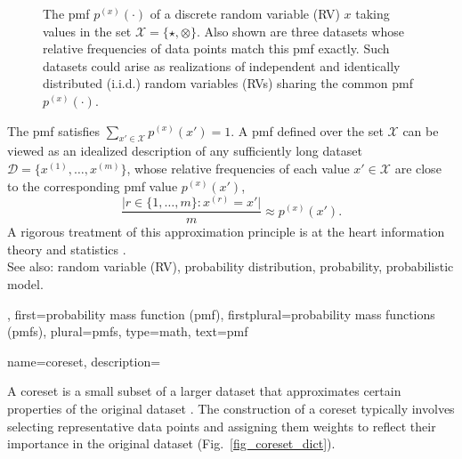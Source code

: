 {{{\begin{figure}[H]
\caption{The pmf $p^{(x)}\left(\cdot\right)$ of a discrete random variable (RV) $x$ 
taking values in the set $\mathcal{X} = \{\star,\otimes\}$. Also shown are 
three datasets whose relative frequencies of data points match 
this pmf exactly. Such datasets could arise as realizations of 
independent and identically distributed (i.i.d.) random variables (RVs) sharing the common pmf $p^{(x)}\left(\cdot\right)$. 
\label{fig_pmf_dict}}
\end{figure}
The pmf satisfies $\sum_{x' \in \mathcal{X}} p^{(x)}\left(x'\right) = 1$. 
A pmf defined over the set $\mathcal{X}$ can be viewed as an idealized description of any sufficiently long 
dataset $\mathcal{D} = \{x^{(1)}, \ldots, x^{(m)}\}$, 
whose relative frequencies of each value $x' \in \mathcal{X}$ 
are close to the corresponding pmf value $p^{(x)}\left(x'\right)$, 
$$ \frac{\big|r \in \{1,\ldots,m\}: x^{(r)}= x' \big|}
{m} \approx p^{(x)}\left(x'\right).$$ 
A rigorous treatment of this approximation principle is at the heart 
information theory and statistics \cite{coverthomas,Kullback68informationtheory,CIT-004}.
				\\
		See also: random variable (RV), probability distribution, probability, probabilistic model.},
	first={probability mass function (pmf)},
	firstplural={probability mass functions (pmfs)},
	plural={pmfs},
	type=math,
	text={pmf} 
}

{name={coreset}, 
	description={A coreset is a small subset of a larger dataset 
		that approximates certain properties of the original dataset \cite{Chai2023}. 
		The construction of a coreset typically involves selecting representative data points
		and assigning them weights to reflect their importance in the original dataset (Fig.\ \ref{fig_coreset_dict}).
        \begin{figure}[H]
			\centering
		\begin{tikzpicture}
  

\end{tikzpicture}
\end{figure}}}}
